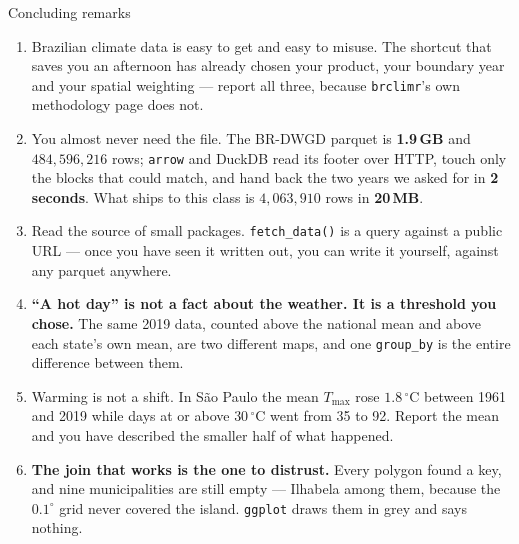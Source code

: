 \documentclass[aspectratio=169,10pt]{beamer}
\newcommand{\code}[1]{\texttt{\small #1}}
\begin{document}
\begin{frame}{Concluding remarks}
  \begin{enumerate}
    \small
    \item Brazilian climate data is easy to get and easy to misuse. The shortcut
          that saves you an afternoon has already chosen your product, your
          boundary year and your spatial weighting --- report all three, because
          \code{brclimr}'s own methodology page does not.
    \item You almost never need the file. The BR-DWGD parquet is \textbf{1.9\,GB}
          and $484{,}596{,}216$ rows; \code{arrow} and DuckDB read its footer over
          HTTP, touch only the blocks that could match, and hand back the two
          years we asked for in \textbf{2 seconds}. What ships to this class is
          $4{,}063{,}910$ rows in \textbf{20\,MB}.
    \item Read the source of small packages. \code{fetch\_data()} is a query
          against a public URL --- once you have seen it written out, you can
          write it yourself, against any parquet anywhere.
    \item \textbf{``A hot day'' is not a fact about the weather. It is a
          threshold you chose.} The same 2019 data, counted above the national
          mean and above each state's own mean, are two different maps, and one
          \code{group\_by} is the entire difference between them.
    \item Warming is not a shift. In São Paulo the mean $T_{\max}$ rose
          $1.8\,^\circ$C between 1961 and 2019 while days at or above
          $30\,^\circ$C went from 35 to 92. Report the mean and you have
          described the smaller half of what happened.
    \item \textbf{The join that works is the one to distrust.} Every polygon
          found a key, and nine municipalities are still empty --- Ilhabela among
          them, because the $0.1^\circ$ grid never covered the island.
          \code{ggplot} draws them in grey and says nothing.
  \end{enumerate}
\end{frame}
\end{document}

